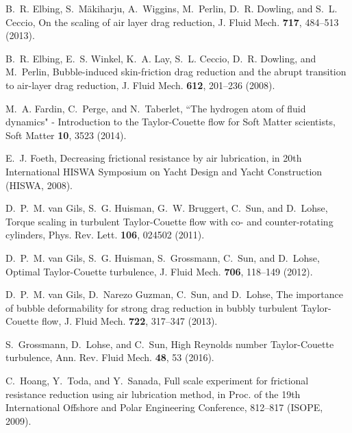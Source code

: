 \documentclass[aps,onecolumn,10pt, floatfix, superscriptaddress,longbibliography, pra]{revtex4-1}
\begin{document}
\begin{thebibliography}{44}
B.~R. Elbing, S.~M\"{a}kiharju, A.~Wiggins, M.~Perlin, D.~R. Dowling, and S.~L.
  Ceccio, {On the scaling of air layer drag reduction}, J. Fluid Mech.
  \textbf{717}, 484--513 (2013).

B.~R. Elbing, E.~S. Winkel, K.~A. Lay, S.~L. Ceccio, D.~R. Dowling, and
  M.~Perlin, {Bubble-induced skin-friction drag reduction and the abrupt
  transition to air-layer drag reduction}, J. Fluid Mech. \textbf{612},
  201--236 (2008).

M.~A. Fardin, C.~Perge, and N.~Taberlet, {``}{{The}} hydrogen atom of fluid
  dynamics{"} - {{Introduction}} to the {{Taylor-Couette}} flow for {{Soft
  Matter}} scientists, Soft Matter \textbf{10}, 3523 (2014).

E.~J. Foeth, Decreasing frictional resistance by air lubrication, in 20th
  International HISWA Symposium on Yacht Design and Yacht Construction (HISWA,
  2008).

D.~P.~M. van Gils, S.~G. Huisman, G.~W. Bruggert, C.~Sun, and D.~Lohse, Torque
  scaling in turbulent {{Taylor-Couette}} flow with co- and counter-rotating
  cylinders, Phys. Rev. Lett. \textbf{106}, 024502 (2011).

D.~P.~M. van Gils, S.~G. Huisman, S.~Grossmann, C.~Sun, and D.~Lohse, Optimal
  {{Taylor-Couette}} turbulence, J. Fluid Mech. \textbf{706}, 118--149 (2012).

D.~P.~M. van Gils, D.~{{Narezo Guzman}}, C.~Sun, and D.~Lohse, The importance
  of bubble deformability for strong drag reduction in bubbly turbulent
  {{Taylor-Couette}} flow, J. Fluid Mech. \textbf{722}, 317--347 (2013).

S.~Grossmann, D.~Lohse, and C.~Sun, High {{Reynolds}} number {{Taylor-Couette}}
  turbulence, Ann. Rev. Fluid Mech. \textbf{48}, 53 (2016).

C.~Hoang, Y.~Toda, and Y.~Sanada, Full scale experiment for frictional
  resistance reduction using air lubrication method, in Proc. of the 19th
  International Offshore and Polar Engineering Conference, 812--817 (ISOPE,
  2009).


\end{thebibliography}
\end{document}
